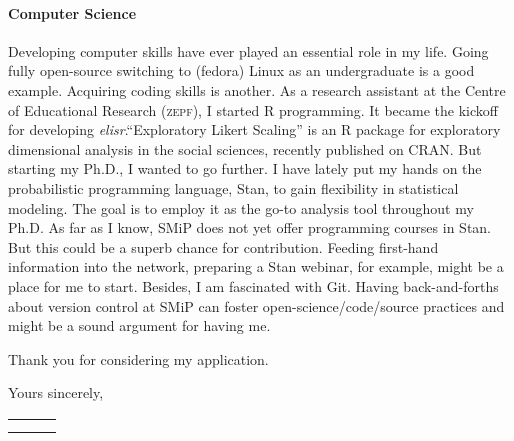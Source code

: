 \documentclass[11pt]{FreemanML}
\begin{document}
\paragraph{Computer Science}

Developing computer skills have ever played an essential role in my life. Going
fully open-source switching to (fedora) Linux as an undergraduate is a good
example. Acquiring coding skills is another. As a research assistant at the
Centre of Educational Research (\textsc{zepf}), I started R programming. It
became the kickoff for developing \textit{elisr}.\enquote{Exploratory Likert
Scaling} is an R package for exploratory dimensional analysis in the social
sciences, recently published on CRAN. But starting my Ph.D., I wanted to go
further. I have lately put my hands on the probabilistic programming language,
Stan, to gain flexibility in statistical modeling. The goal is to employ it as
the go-to analysis tool throughout my Ph.D. As far as I know, SMiP does not yet
offer programming courses in Stan. But this could be a superb chance for
contribution. Feeding first-hand information into the network,  preparing a
Stan webinar, for example, might be a place for me to start. Besides, I am
fascinated with Git. Having back-and-forths about version control at SMiP can
foster open-science/code/source practices and might be a sound argument for
having me.

\medskip

Thank you for considering my application.

\medskip

Yours sincerely,

\bigskip
\bigskip


\begin{tabular}{p{8cm}p{.5cm}l}
\dotfill \\ 
\centering{Steven Marcel Bißantz} 
\end{tabular}%
\vfill

\end{document}
